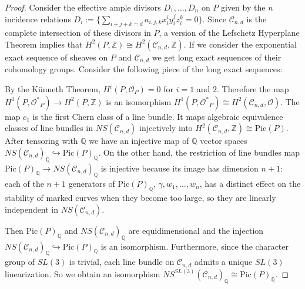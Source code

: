 \documentclass{amsart}
\newcommand{\Z}{\mathbb{Z}}
\newcommand{\Q}{\mathbb{Q}}
\newcommand{\mc}{\mathcal}
\numberwithin{equation}{section}
\theoremstyle{definition}
\begin{document}
\begin{proof}
    Consider the effective ample divisors  $D_1, \dots , D_n$ on $P$ given by the $n$ incidence relations $D_i := \{ \sum_{i+j+k=d} a_{i,j,k}x_i^iy_i^jz_i^k = 0\}$. Since $\mc{C}_{n,d}$ is the complete intersection of these divisors in $P$, a version of the Lefschetz Hyperplane Theorem \cite[Remark 3.1.32]{LazarsPos} implies that $H^2(P, \Z) \cong H^2(\mc{C}_{n,d}, \Z)$. If we consider the exponential exact sequence of sheaves on $P$ and $\mc{C}_{n,d}$ we get long exact sequences of their cohomology groups. Consider the following piece of the long exact sequences:

\begin{center}

    
\end{center}

By the K\"unneth Theorem, $H^i(P, \mc{O}_P)=0$ for $i=1$ and $2$. Therefore the map $H^1(P, \mc{O^*}_P) \rightarrow H^2(P, \Z)$ is an isomorphism $H^1(P, \mc{O^*}_P) \cong H^2(\mc{C}_{n,d}, \mc{O}).$ The map $c_1$ is the first Chern class of a line bundle. It maps algebraic equivalence classes of line bundles in $NS(\mc{C}_{n,d}) $ injectively into $H^2(\mc{C}_{n,d}, \Z) \cong \text{Pic}(P).$ After tensoring with $\Q$ we have an injective map of $\Q$ vector spaces $NS(\mc{C}_{n,d})_\Q \hookrightarrow \text{Pic}(P)_\Q $. On the other hand, the restriction of line bundles map $\text{Pic}(P)_\Q \rightarrow NS(\mc{C}_{n,d})_\Q$ is injective because its image has dimension $n+1$: each of the $n+1$ generators of Pic$(P)_\Q$, $\gamma, w_1, \dots, w_n$, has a distinct effect on the stability of marked curves when they become too large, so they are linearly independent in $NS(\mc{C}_{n,d})$.

Then Pic$(P)_\Q$ and $NS(\mc{C}_{n,d})_\Q$ are equidimensional and the injection $NS(\mc{C}_{n,d})_\Q \hookrightarrow \text{Pic}(P)_\Q $ is an isomorphism. Furthermore, since the character group of $SL(3)$ is trivial, each line bundle on $\mc{C}_{n,d}$ admits a unique $SL(3)$ linearization. So we obtain an isomorphism $NS^{SL(3)}(\mc{C}_{n,d})_\Q \cong \text{Pic}(P)_\Q$.
\end{proof}
\end{document}
